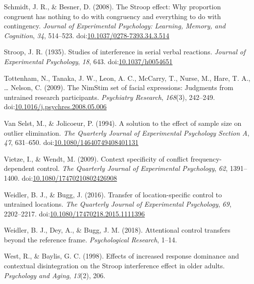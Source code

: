 \documentclass[english,,man,floatsintext]{apa6}
\begin{document}
\leavevmode\hypertarget{ref-schmidt_stroop_2008}{}%
Schmidt, J. R., \& Besner, D. (2008). The Stroop effect: Why proportion congruent has nothing to do with congruency and everything to do with contingency. \emph{Journal of Experimental Psychology: Learning, Memory, and Cognition}, \emph{34}, 514--523. doi:\href{https://doi.org/10.1037/0278-7393.34.3.514}{10.1037/0278-7393.34.3.514}

\leavevmode\hypertarget{ref-stroop_studies_1935}{}%
Stroop, J. R. (1935). Studies of interference in serial verbal reactions. \emph{Journal of Experimental Psychology}, \emph{18}, 643. doi:\href{https://doi.org/10.1037/h0054651}{10.1037/h0054651}

\leavevmode\hypertarget{ref-tottenham_nimstim_2009}{}%
Tottenham, N., Tanaka, J. W., Leon, A. C., McCarry, T., Nurse, M., Hare, T. A., \ldots{} Nelson, C. (2009). The NimStim set of facial expressions: Judgments from untrained research participants. \emph{Psychiatry Research}, \emph{168}(3), 242--249. doi:\href{https://doi.org/10.1016/j.psychres.2008.05.006}{10.1016/j.psychres.2008.05.006}

\leavevmode\hypertarget{ref-van_selst_solution_1994}{}%
Van Selst, M., \& Jolicoeur, P. (1994). A solution to the effect of sample size on outlier elimination. \emph{The Quarterly Journal of Experimental Psychology Section A}, \emph{47}, 631--650. doi:\href{https://doi.org/10.1080/14640749408401131}{10.1080/14640749408401131}

\leavevmode\hypertarget{ref-vietze_context_2009}{}%
Vietze, I., \& Wendt, M. (2009). Context specificity of conflict frequency-dependent control. \emph{The Quarterly Journal of Experimental Psychology}, \emph{62}, 1391--1400. doi:\href{https://doi.org/10.1080/17470210802426908}{10.1080/17470210802426908}

\leavevmode\hypertarget{ref-weidler_transfer_2016}{}%
Weidler, B. J., \& Bugg, J. (2016). Transfer of location-specific control to untrained locations. \emph{The Quarterly Journal of Experimental Psychology}, \emph{69}, 2202--2217. doi:\href{https://doi.org/10.1080/17470218.2015.1111396}{10.1080/17470218.2015.1111396}

\leavevmode\hypertarget{ref-weidler_attentional_2018}{}%
Weidler, B. J., Dey, A., \& Bugg, J. M. (2018). Attentional control transfers beyond the reference frame. \emph{Psychological Research}, 1--14.

\leavevmode\hypertarget{ref-west_effects_1998}{}%
West, R., \& Baylis, G. C. (1998). Effects of increased response dominance and contextual disintegration on the Stroop interference effect in older adults. \emph{Psychology and Aging}, \emph{13}(2), 206.

\endgroup
\end{document}
